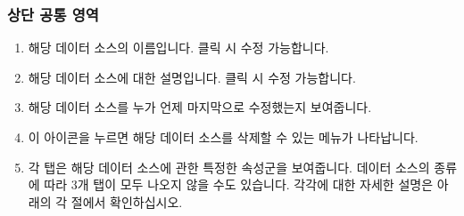\documentclass[letterpaper,10pt,english]{sphinxmanual}
\begin{document}
\subsubsection{상단 공통 영역}
\label{\detokenize{discovery/part02/data_source_detail_view:id2}}\begin{enumerate}
\def\theenumi{\arabic{enumi}}
\def\labelenumi{\theenumi .}
\makeatletter\def\p@enumii{\p@enumi \theenumi .}\makeatother
\item {} 
 해당 데이터 소스의 이름입니다. 클릭 시 수정 가능합니다.

\item {} 
 해당 데이터 소스에 대한 설명입니다. 클릭 시 수정 가능합니다.

\item {} 
 해당 데이터 소스를 누가 언제 마지막으로 수정했는지 보여줍니다.

\item {} 
 이 아이콘을 누르면 해당 데이터 소스를 삭제할 수 있는 메뉴가 나타납니다.

\item {} 
 각 탭은 해당 데이터 소스에 관한 특정한 속성군을 보여줍니다. 데이터 소스의 종류에 따라 3개 탭이 모두 나오지 않을 수도 있습니다. 각각에 대한 자세한 설명은 아래의 각 절에서 확인하십시오.

\end{enumerate}
\end{document}
